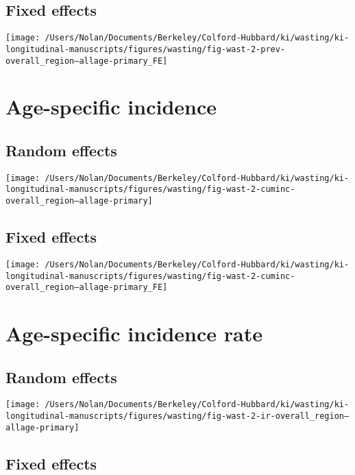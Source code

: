 \documentclass[9pt,]{book}
\begin{document}
\subsection{Fixed effects}\label{fixed-effects}

\texttt{[image: /Users/Nolan/Documents/Berkeley/Colford-Hubbard/ki/wasting/ki-longitudinal-manuscripts/figures/wasting/fig-wast-2-prev-overall\_region--allage-primary\_FE]}

\section{Age-specific incidence}\label{age-specific-incidence}

\subsection{Random effects}\label{random-effects-1}

\texttt{[image: /Users/Nolan/Documents/Berkeley/Colford-Hubbard/ki/wasting/ki-longitudinal-manuscripts/figures/wasting/fig-wast-2-cuminc-overall\_region--allage-primary]}

\subsection{Fixed effects}\label{fixed-effects-1}

\texttt{[image: /Users/Nolan/Documents/Berkeley/Colford-Hubbard/ki/wasting/ki-longitudinal-manuscripts/figures/wasting/fig-wast-2-cuminc-overall\_region--allage-primary\_FE]}

\section{Age-specific incidence rate}\label{age-specific-incidence-rate}

\subsection{Random effects}\label{random-effects-2}

\texttt{[image: /Users/Nolan/Documents/Berkeley/Colford-Hubbard/ki/wasting/ki-longitudinal-manuscripts/figures/wasting/fig-wast-2-ir-overall\_region--allage-primary]}

\subsection{Fixed effects}\label{fixed-effects-2}
\end{document}
